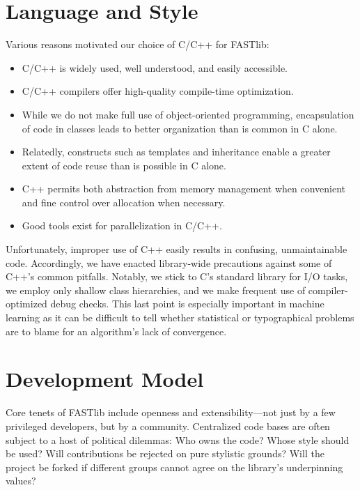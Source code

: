 \documentclass[letter]{report}
\begin{document}
\section {Language and Style}
Various reasons motivated our choice of C/C++ for FASTlib:
\begin{itemize}
\item C/C++ is widely used, well understood, and easily accessible.
\item C/C++ compilers offer high-quality compile-time optimization.
\item While we do not make full use of object-oriented programming,
  encapsulation of code in classes leads to better organization than
  is common in C alone.
\item Relatedly, constructs such as templates and inheritance enable a
  greater extent of code reuse than is possible in C alone.
\item C++ permits both abstraction from memory management when
  convenient and fine control over allocation when necessary.
\item Good tools exist for parallelization in C/C++.
\end{itemize}
Unfortunately, improper use of C++ easily results in confusing,
unmaintainable code.  Accordingly, we have enacted library-wide
precautions against some of C++'s common pitfalls.  Notably, we stick
to C's standard library for I/O tasks, we employ only shallow class
hierarchies, and we make frequent use of compiler-optimized debug
checks.  This last point is especially important in machine learning
as it can be difficult to tell whether statistical or typographical
problems are to blame for an algorithm's lack of convergence.

\section{Development Model}
Core tenets of FASTlib include openness and extensibility---not just by
a few privileged developers, but by a community.  Centralized code
bases are often subject to a host of political dilemmas: Who owns the
code?  Whose style should be used?  Will contributions be rejected on
pure stylistic grounds?  Will the project be forked if different
groups cannot agree on the library's underpinning values?
\end{document}
